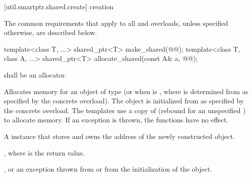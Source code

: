 [util.smartptr.shared.create]{ creation}

\pnum
The common requirements that apply to
all  and  overloads,
unless specified otherwise, are described below.

%
%
\begin{itemdecl}
template<class T, ...>
  shared_ptr<T> make_shared(@@);
template<class T, class A, ...>
  shared_ptr<T> allocate_shared(const A& a, @@);
\end{itemdecl}

\begin{itemdescr}
\pnum
\requires {} shall be an allocator.

\pnum
\effects Allocates memory for an object of type 
(or  when  is ,
where  is determined from  as specified by the concrete overload).
The object is initialized from  as specified by the concrete overload.
The  templates use a copy of 
(rebound for an unspecified ) to allocate memory.
If an exception is thrown, the functions have no effect.

\pnum
\returns A  instance that stores and owns the address of
the newly constructed object.

\pnum
\postconditions {},
where  is the return value.

\pnum
\throws {}, or
an exception thrown from  or from the initialization of the object.


\end{itemdescr}
